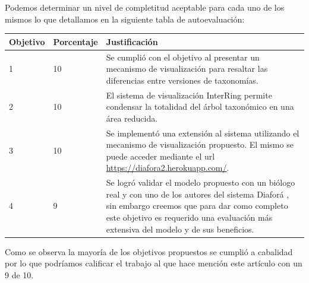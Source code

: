 \documentclass[journal]{IEEEtran}
\begin{document}
Podemos determinar un nivel de completitud aceptable para cada uno de los mismos lo que detallamos en la siguiente tabla de autoevaluación:
\begin{table}[h!]
  \begin{tabular}{|m{1cm}|m{1cm}|m{4cm}|}
  \hline
  Objetivo & Porcentaje & Justificación \\
  \hline \hline
  1 & 10 & Se cumplió con el objetivo al presentar un mecanismo de visualización para resaltar las diferencias entre versiones de taxonomías.\\
  \hline
  2 & 10 & El sistema de visualización InterRing \cite{yang_ward_rundensteiner} permite condensar la totalidad del árbol taxonómico en una área reducida. \\
  \hline
  3 & 10 & Se implementó una extensión al sistema utilizando el mecanismo de visualización propuesto. El mismo se puede acceder mediante el url \url{https://diafora2.herokuapp.com/}. \\
  \hline
  4 & 9 & Se logró validar el modelo propuesto con un biólogo real y con uno de los autores del sistema Diaforá \cite{sancho_diafora}, sin embargo creemos que para dar como completo este objetivo es requerido
  una evaluación más extensiva del modelo y  de sus beneficios. \\
\hline
\end{tabular}
  \end{table}

Como se observa  la mayoría de los objetivos propuestos se cumplió a cabalidad por lo que podríamos calificar el trabajo al que hace mención este artículo con un 9 de 10.





\end{document}
